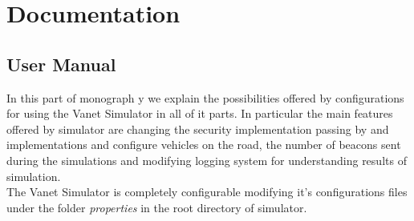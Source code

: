 \section{Documentation}
\subsection{User Manual}
In this part of monograph y we explain the possibilities offered by configurations for using the Vanet Simulator in all of it parts. In particular the main features offered by simulator are changing the security implementation passing by \baseline and \hybrid implementations and configure vehicles on the road, the number of beacons sent during the simulations and modifying logging system for understanding results of simulation.\\
The Vanet Simulator is completely configurable modifying it's configurations files under the folder \textit{properties} in the root directory of simulator.
